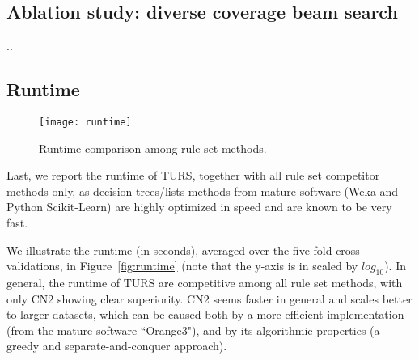 \subsection{Ablation study: diverse coverage beam search}
..
\subsection{Runtime}
\begin{figure}[ht] \label{fig:runtime}
	\texttt{[image: runtime]}
	\caption{Runtime comparison among rule set methods.}	 
	\label{fig:heatmap_modelcomplexity}
\end{figure}
Last, we report the runtime of TURS, together with all rule set competitor methods only, as decision trees/lists methods from mature software (Weka and Python Scikit-Learn) are highly optimized in speed and are known to be very fast. 

We illustrate the runtime (in seconds), averaged over the five-fold cross-validations, in Figure~\ref{fig:runtime} (note that the y-axis is in scaled by $log_{10}$). In general, the runtime of TURS are competitive among all rule set methods, with only CN2 showing clear superiority. CN2 seems faster in general and scales better to larger datasets, which can be caused both by a more efficient implementation (from the mature software ``Orange3"), and by its algorithmic properties (a greedy and separate-and-conquer approach). 














